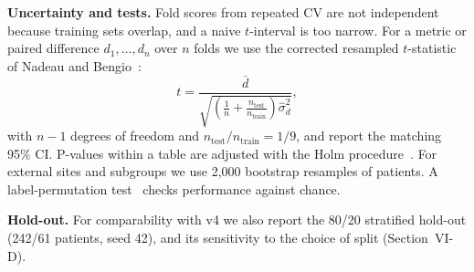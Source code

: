 \textbf{Uncertainty and tests.} Fold scores from repeated CV are not independent because training sets overlap, and a naive $t$-interval is too narrow. For a metric or paired difference $d_1,\dots,d_n$ over $n$ folds we use the corrected resampled $t$-statistic of Nadeau and Bengio~\cite{nadeau2003,bouckaert2004}:
\begin{equation}
t=\frac{\bar d}{\sqrt{\left(\frac1n+\frac{n_{\text{test}}}{n_{\text{train}}}\right)\hat\sigma^2_d}},
\end{equation}
with $n-1$ degrees of freedom and $n_{\text{test}}/n_{\text{train}}=1/9$, and report the matching 95\% CI. P-values within a table are adjusted with the Holm procedure~\cite{holm1979}. For external sites and subgroups we use 2{,}000 bootstrap resamples of patients. A label-permutation test~\cite{ojala2010} checks performance against chance.

\textbf{Hold-out.} For comparability with v4 we also report the 80/20 stratified hold-out (242/61 patients, seed 42), and its sensitivity to the choice of split (Section~VI-D).
